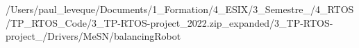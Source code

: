 /\+Users/paul\+\_\+leveque/\+Documents/1\+\_\+\+Formation/4\+\_\+\+ESIX/3\+\_\+\+Semestre\+\_/4\+\_\+\+RTOS/\+TP\+\_\+\+RTOS\+\_\+\+Code/3\+\_\+\+TP-\/\+RTOS-\/project\+\_\+2022.zip\+\_\+expanded/3\+\_\+\+TP-\/\+RTOS-\/project\+\_/\+Drivers/\+Me\+SN/balancing\+Robot 
